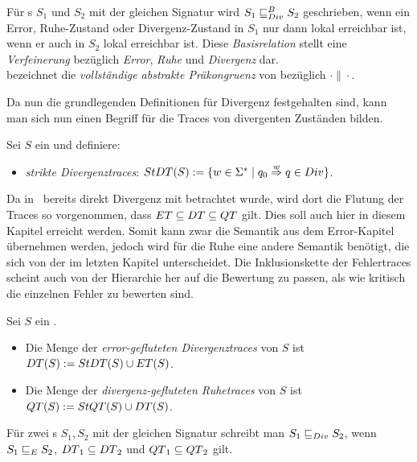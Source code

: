 \begin{Def}
\label{DefDivBasisrel}
Für \EIO{}s $S_1$ und $S_2$ mit der gleichen Signatur wird $S_1\sqsubseteq _{Div}^B S_2$
geschrieben, wenn ein Error, Ruhe-Zustand oder Divergenz-Zustand in $S_1$ nur
dann lokal erreichbar ist, wenn er auch in $S_2$ lokal erreichbar ist. Diese
\emph{Basisrelation} stellt eine \emph{Verfeinerung} bezüglich \emph{Error},
\emph{Ruhe} und \emph{Divergenz} dar.\\
\DCRel{} bezeichnet die \emph{vollständige abstrakte Präkongruenz} von \DBRel{}
bezüglich $\cdot\|\cdot$.
\end{Def}

Da nun die grundlegenden Definitionen für Divergenz festgehalten sind,
kann man sich nun einen Begriff für die Traces von divergenten Zuständen
bilden.\\

\begin{Def}[Divergenztraces]
  Sei $S$ ein \EIO{} und definiere:
  \begin{itemize}
    \item \emph{strikte Divergenztraces}: $StDT{}(S) := \{w\in\Sigma ^*\mid
      q_0 \overset{w}{\Rightarrow} q\in Div\}$.%
  \end{itemize}
\end{Def}

Da in~\cite{Chilton2013} bereits direkt Divergenz mit betrachtet wurde, wird
dort die Flutung der Traces so vorgenommen, dass $ET\subseteq DT\subseteq
QT$ gilt. Dies soll auch hier in diesem Kapitel erreicht werden. Somit kann
zwar die Semantik aus dem Error-Kapitel übernehmen werden, jedoch wird für die
Ruhe eine andere Semantik benötigt, die sich von der im letzten Kapitel
unterscheidet. Die Inklusionskette der Fehlertraces scheint auch von der
Hierarchie her auf die Bewertung zu passen, als wie kritisch die einzelnen
Fehler zu bewerten sind.

\begin{Def}
\label{DefRuheDivSemantik}
  Sei $S$ ein \EIO{}.
  \begin{itemize}
    \item Die Menge der \emph{error-gefluteten Divergenztraces} von $S$ ist
      $DT{}(S) := StDT{}(S)\cup ET{}(S)$.%
    \item Die Menge der \emph{divergenz-gefluteten Ruhetraces} von $S$ ist
      $QT{}(S) := StQT{}(S)\cup DT{}(S)$.
  \end{itemize}
  Für zwei \EIO{}s $S_1, S_2$ mit der gleichen Signatur schreibt man $S_1\sqsubseteq _{Div}
  S_2$, wenn $S_1\sqsubseteq _E S_2$, $DT{}_1\subseteq DT{}_2$ und
  $QT{}_1\subseteq QT{}_2$ gilt.
\end{Def}


